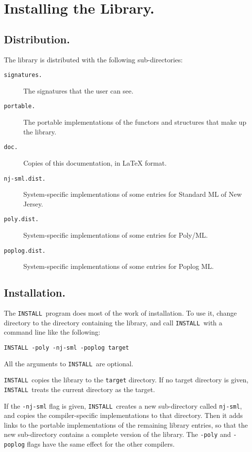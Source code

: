 %
%

\chapter{Installing the Library.}	\label{install}

\section{Distribution.}

The library is distributed with the following sub-directories:

\begin{description}
  \item[\tt signatures.] The signatures that the user can see.
  \item[\tt portable.] The portable implementations of the functors
	and structures that make up the library.
  \item[\tt doc.] Copies of this documentation, in LaTeX format.
  \item[\tt nj-sml.dist.] System-specific implementations of some entries
	for Standard ML of New Jersey.
  \item[\tt poly.dist.] System-specific implementations of some entries
	for Poly/ML.
  \item[\tt poplog.dist.] System-specific implementations of some entries
	for Poplog ML.
\end{description} 

\section{Installation.}

\newcommand{\install}{{\small\tt INSTALL}}

The \install\ program does most of the work of installation.
To use it, change directory to the directory containing the library,
and call \install\ with a command line like the following:
\begin{verbatim}
INSTALL -poly -nj-sml -poplog target
\end{verbatim}
All the arguments to \install\ are optional.

\install\ copies the library to the {\tt target} directory.
If no target directory is given,
\install\ treats the current directory as the target.

If the {\tt -nj-sml} flag is given, \install\ creates a new
sub-directory called {\tt nj-sml}, and copies the compiler-specific
implementations to that directory.  Then it adds links to the
portable implementations of the remaining library entries, so
that the new sub-directory contains a complete version of the
library.  The {\tt -poly} and {\tt -poplog} flags have the same
effect for the other compilers.

